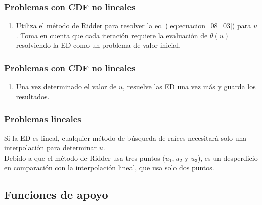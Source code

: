 \documentclass[12pt]{beamer}
\begin{document}
\begin{frame}
\frametitle{Problemas con CDF no lineales}
\begin{enumerate}[<+->]
\conti
\item Utiliza el método de Ridder para resolver la ec. (\ref{eq:ecuacion_08_03}) para $u$. Toma en cuenta que cada iteración requiere la evaluación de $\theta (u)$ resolviendo la ED como un problema de valor inicial.
\seti
\end{enumerate}
\end{frame}
\begin{frame}
\frametitle{Problemas con CDF no lineales}
\begin{enumerate}[<+->]
\conti
\item Una vez determinado el valor de $u$, resuelve las ED una vez más y guarda los resultados.
\end{enumerate}
\end{frame}
\begin{frame}
\frametitle{Problemas lineales}
Si la ED es lineal, cualquier método de búsqueda de raíces necesitará solo una interpolación para determinar $u$.
\\
\bigskip
\pause
Debido a que el método de Ridder usa tres puntos $(u_{1}, u_{2}$ y $u_{3}$), es un desperdicio en comparación con la interpolación lineal, que usa solo dos puntos.
\end{frame}

\subsection{Funciones de apoyo}
\end{document}
